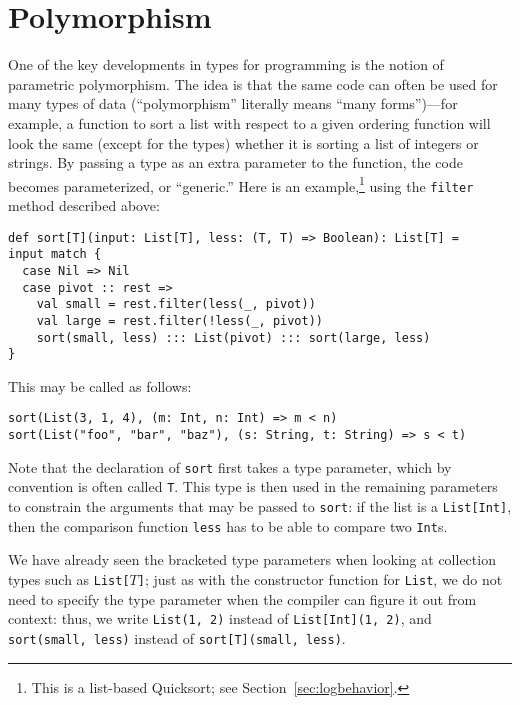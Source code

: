 \section{Polymorphism}
One of the key developments in types for programming is the notion of parametric polymorphism. The idea is that the same code can often be used for many types of data (``polymorphism'' literally means ``many forms'')---for example, a function to sort a list with respect to a given ordering function will look the same (except for the types) whether it is sorting a list of integers or strings. By passing a type as an extra parameter to the function, the code becomes parameterized, or ``generic.'' Here is an example,\footnote{This is a list-based Quicksort; see Section~\ref{sec:logbehavior}.} using the \verb|filter| method described above:
\begin{verbatim}
def sort[T](input: List[T], less: (T, T) => Boolean): List[T] =
input match {
  case Nil => Nil
  case pivot :: rest =>
    val small = rest.filter(less(_, pivot))
    val large = rest.filter(!less(_, pivot))
    sort(small, less) ::: List(pivot) ::: sort(large, less)
}
\end{verbatim}
This may be called as follows:
\begin{verbatim}
sort(List(3, 1, 4), (m: Int, n: Int) => m < n)
sort(List("foo", "bar", "baz"), (s: String, t: String) => s < t)
\end{verbatim}

Note that the declaration of \verb|sort| first takes a type parameter, which by convention is often called \verb|T|. This type is then used in the remaining parameters to constrain the arguments that may be passed to \verb|sort|: if the list is a \verb|List[Int]|, then the comparison function \verb|less| has to be able to compare two \verb|Int|s.

We have already seen the bracketed type parameters when looking at collection types such as \texttt{List[$T$]}; just as with the constructor function for \verb|List|, we do not need to specify the type parameter when the compiler can figure it out from context: thus, we write \verb|List(1, 2)| instead of \verb|List[Int](1, 2)|, and \verb|sort(small, less)| instead of \verb|sort[T](small, less)|.

